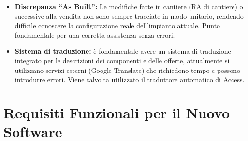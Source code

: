 \documentclass[12pt, a4paper]{article} %
\begin{document}
\begin{itemize}
            Serve un sistema di tracciamento delle sostituzioni e obsolescenze (Es: Fusion).
      \item \textbf{Discrepanza ``As Built'':} Le modifiche fatte in cantiere (RA di cantiere) o successive alla vendita non sono sempre tracciate in modo unitario, rendendo difficile conoscere la configurazione reale dell'impianto attuale.
            Punto fondamentale per una corretta assistenza senza errori.
      \item \textbf{Sistema di traduzione:} è fondamentale avere un sistema di traduzione integrato per le descrizioni dei componenti e delle offerte,
            attualmente si utilizzano servizi esterni (Google Translate) che richiedono tempo e possono introdurre errori.
            Viene talvolta utilizzato il traduttore automatico di Access.
\end{itemize}

\section{Requisiti Funzionali per il Nuovo Software}
\end{document}
